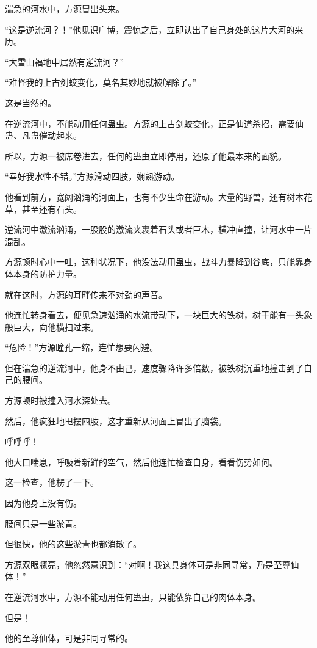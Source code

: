 \begin{this_body}
湍急的河水中，方源冒出头来。

“这是逆流河？！”他见识广博，震惊之后，立即认出了自己身处的这片大河的来历。

“大雪山福地中居然有逆流河？”

“难怪我的上古剑蛟变化，莫名其妙地就被解除了。”

这是当然的。

在逆流河中，不能动用任何蛊虫。方源的上古剑蛟变化，正是仙道杀招，需要仙蛊、凡蛊催动起来。

所以，方源一被席卷进去，任何的蛊虫立即停用，还原了他最本来的面貌。

“幸好我水性不错。”方源滑动四肢，娴熟游动。

他看到前方，宽阔汹涌的河面上，也有不少生命在游动。大量的野兽，还有树木花草，甚至还有石头。

逆流河中激流汹涌，一股股的激流夹裹着石头或者巨木，横冲直撞，让河水中一片混乱。

方源顿时心中一吐，这种状况下，他没法动用蛊虫，战斗力暴降到谷底，只能靠身体本身的防护力量。

就在这时，方源的耳畔传来不对劲的声音。

他连忙转身看去，便见急速汹涌的水流带动下，一块巨大的铁树，树干能有一头象般巨大，向他横扫过来。

“危险！”方源瞳孔一缩，连忙想要闪避。

但在湍急的逆流河中，他身不由己，速度骤降许多倍数，被铁树沉重地撞击到了自己的腰间。

方源顿时被撞入河水深处去。

然后，他疯狂地甩摆四肢，这才重新从河面上冒出了脑袋。

呼呼呼！

他大口喘息，呼吸着新鲜的空气，然后他连忙检查自身，看看伤势如何。

这一检查，他楞了一下。

因为他身上没有伤。

腰间只是一些淤青。

但很快，他的这些淤青也都消散了。

方源双眼骤亮，他忽然意识到：“对啊！我这具身体可是非同寻常，乃是至尊仙体！”

在逆流河水中，方源不能动用任何蛊虫，只能依靠自己的肉体本身。

但是！

他的至尊仙体，可是非同寻常的。

\end{this_body}

